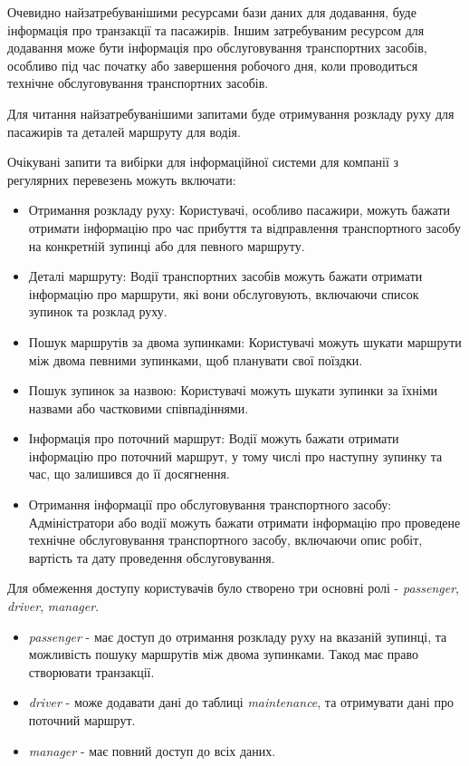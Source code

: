 \documentclass[oneside,14pt]{extarticle}
\begin{document}
Очевидно найзатребуванішими ресурсами бази даних для додавання, буде інформація про транзакції та пасажирів. Іншим затребуваним ресурсом для додавання може бути інформація про обслуговування транспортних засобів, особливо під час початку або завершення робочого дня, коли проводиться технічне обслуговування транспортних засобів.

Для читання найзатребуванішими запитами буде отримування розкладу руху для пасажирів та деталей маршруту для водія.

Очікувані запити та вибірки для інформаційної системи для компанії з регулярних перевезень можуть включати:
\begin{itemize}
\item Отримання розкладу руху: Користувачі, особливо пасажири, можуть бажати отримати інформацію про час прибуття та відправлення транспортного засобу на конкретній зупинці або для певного маршруту.
\item Деталі маршруту: Водії транспортних засобів можуть бажати отримати інформацію про маршрути, які вони обслуговують, включаючи список зупинок та розклад руху.
\item Пошук маршрутів за двома зупинками: Користувачі можуть шукати маршрути між двома певними зупинками, щоб планувати свої поїздки.
\item Пошук зупинок за назвою: Користувачі можуть шукати зупинки за їхніми назвами або частковими співпадіннями.
\item Інформація про поточний маршрут: Водії можуть бажати отримати інформацію про поточний маршрут, у тому числі про наступну зупинку та час, що залишився до її досягнення.
\item Отримання інформації про обслуговування транспортного засобу: Адміністратори або водії можуть бажати отримати інформацію про проведене технічне обслуговування транспортного засобу, включаючи опис робіт, вартість та дату проведення обслуговування.
\end{itemize}

Для обмеження доступу користувачів було створено три основні ролі - \textit{passenger}, \textit{driver}, \textit{manager}.

\begin{itemize}
\item \textit{passenger} - має доступ до отримання розкладу руху на вказаній зупинці, та можливість пошуку маршрутів між двома зупинками. Такод має право створювати транзакції.
\item \textit{driver} - може додавати дані до таблиці \textit{maintenance}, та отримувати дані про поточний маршрут.
\item \textit{manager} - має повний доступ до всіх даних.
\end{itemize}
\end{document}
